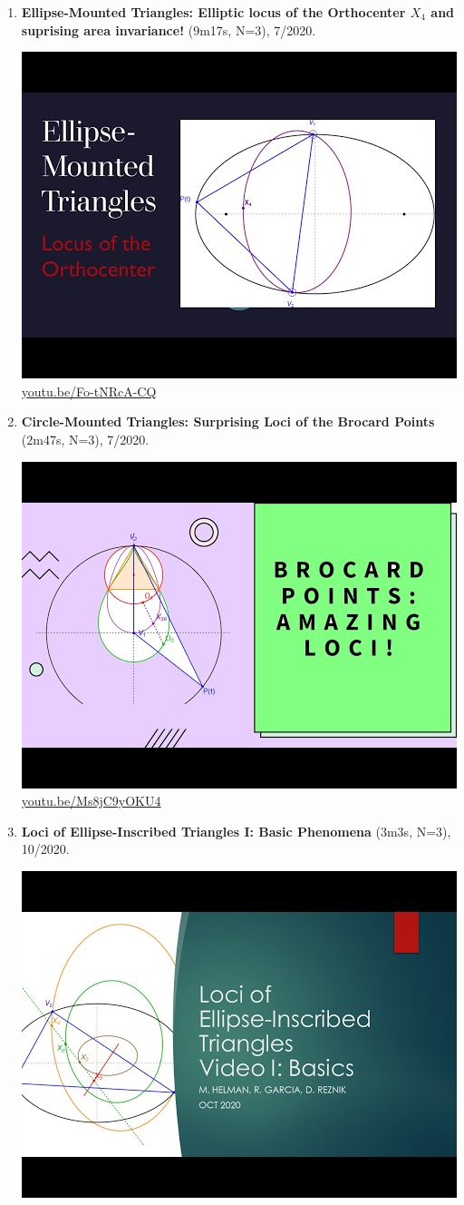 \documentclass[12pt]{amsart}
\begin{document}
\begin{enumerate}[resume]
\item \textbf{Ellipse-Mounted Triangles: Elliptic locus of the Orthocenter $X_{4}$ and suprising area invariance!} (9m17s, N=3), 7/2020. 
\begin{center}\includegraphics[width=.5\textwidth]{pics/Fo-tNRcA-CQ.jpg} \\ 
\href{https://youtu.be/Fo-tNRcA-CQ}{\url{youtu.be/Fo-tNRcA-CQ}}\end{center}
% 
\item \textbf{Circle-Mounted Triangles: Surprising Loci of the Brocard Points} (2m47s, N=3), 7/2020. 
\begin{center}\includegraphics[width=.5\textwidth]{pics/Ms8jC9yOKU4.jpg} \\ 
\href{https://youtu.be/Ms8jC9yOKU4}{\url{youtu.be/Ms8jC9yOKU4}}\end{center}
% 
\item \textbf{Loci of Ellipse-Inscribed Triangles I: Basic Phenomena} (3m3s, N=3), 10/2020. 
\begin{center}\includegraphics[width=.5\textwidth]{pics/zjiNgfndBWg.jpg} \\ 

\end{center}
\end{enumerate}
\end{document}
